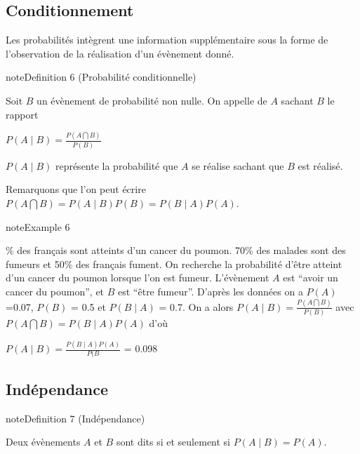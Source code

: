 \documentclass[letterpaper,10pt,english]{jupyterBook}
\begin{document}
\subsection{Conditionnement}
\label{\detokenize{Rappels:conditionnement}}
\sphinxAtStartPar
Les probabilités  intègrent une information supplémentaire sous la forme de l’observation de la réalisation d’un évènement donné.

\ignorespaces \label{Rappels:definition-11}
\begin{sphinxadmonition}{note}{Definition 6 (Probabilité conditionnelle)}



\sphinxAtStartPar
Soit \(B\) un évènement de probabilité non nulle. On appelle  de \(A\) sachant \(B\) le rapport

\sphinxAtStartPar
\(P(A\mid B) = \frac{P(A\bigcap B)}{P(B)}\)
\end{sphinxadmonition}

\sphinxAtStartPar
\(P(A\mid B)\) représente la probabilité que \(A\) se réalise sachant que \(B\) est réalisé.

\sphinxAtStartPar
Remarquons que l’on peut écrire \(P(A\bigcap B) = P(A\mid B)P(B) = P(B\mid A)P(A)\).
\label{Rappels:example-12}
\begin{sphinxadmonition}{note}{Example 6}



\% des français sont atteints d’un cancer du poumon. 70\% des malades sont des fumeurs et 50\% des français fument. On recherche la probabilité d’être atteint d’un cancer du poumon lorsque l’on est fumeur.
L’évènement \(A\) est “avoir un cancer du poumon”, et \(B\) est “être fumeur”. D’après les données on a \(P(A)\)=0.07, \(P(B)\) = 0.5 et \(P(B\mid A)\) = 0.7.
On a alors \(P(A\mid B) = \frac{P(A\bigcap B)}{P(B)}\) avec \(P(A\bigcap B)=P(B\mid A)P(A)\) d’où

\sphinxAtStartPar
\(P(A\mid B)=\frac{P(B\mid A)P(A)}{P(B}\) = 0.098
\end{sphinxadmonition}


\subsection{Indépendance}
\label{\detokenize{Rappels:independance}}
\ignorespaces \label{Rappels:definition-13}
\begin{sphinxadmonition}{note}{Definition 7 (Indépendance)}



\sphinxAtStartPar
Deux évènements \(A\) et \(B\) sont dits  si et seulement si \(P(A\mid B) = P(A)\).
\end{sphinxadmonition}
\end{document}
